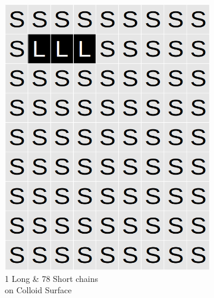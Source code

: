 \documentclass[journal=jacsat,manuscript=article]{achemso}
\begin{document}
\begin{figure}[H]
\begin{subfigure}[b]{0.4\textwidth}
        \includegraphics[scale=0.15]{fig8b.png}
        \caption{1 Long \& 78 Short chains\\ on Colloid Surface}
        \label{fig:B}
    \end{subfigure}
    \begin{subfigure}[b]{0.4\textwidth}

\end{subfigure}
\end{figure}
\end{document}
